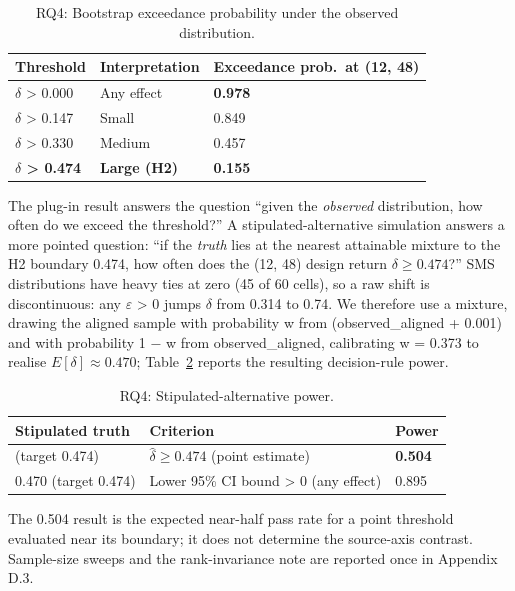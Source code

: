 \documentclass[review,12pt,authoryear]{elsarticle}
\begin{document}
{\def\LTcaptype{table} %
\begin{longtable}[]{@{}lll@{}}
\caption{RQ4: Bootstrap exceedance probability under the observed
distribution.}\label{tab:rq4-observed-exceedance}\\
\toprule\noalign{}
Threshold & Interpretation & Exceedance prob.\ at (12, 48) \\
\midrule\noalign{}
\endhead
\bottomrule\noalign{}
\endlastfoot
$\delta$ \textgreater{} 0.000 & Any effect & \textbf{0.978} \\
$\delta$ \textgreater{} 0.147 & Small & 0.849 \\
$\delta$ \textgreater{} 0.330 & Medium & 0.457 \\
\textbf{$\delta$ \textgreater{} 0.474} & \textbf{Large (H2)} &
\textbf{0.155} \\
\end{longtable}
}

The plug-in result answers the question ``given the \emph{observed}
distribution, how often do we exceed the threshold?'' A
stipulated-alternative simulation answers a more pointed question: ``if
the \emph{truth} lies at the nearest attainable mixture to the H2
boundary 0.474, how often does the (12,
48) design return $\delta \geq 0.474$?'' SMS distributions have heavy ties at zero
(45 of 60 cells), so a raw shift is discontinuous: any $\varepsilon$ \textgreater{}
0 jumps $\delta$ from 0.314 to 0.74. We therefore use a mixture, drawing the
aligned sample with probability w from (observed\_aligned + 0.001) and
with probability 1 − w from observed\_aligned, calibrating w = 0.373 to
realise $E[\delta] \approx 0.470$; Table~\ref{tab:p2-11} reports the
resulting decision-rule power.

{\def\LTcaptype{table} %
\begin{longtable}[]{@{}lll@{}}
\caption{RQ4: Stipulated-alternative power.}\label{tab:p2-11}\\
\toprule\noalign{}
Stipulated truth & Criterion & Power \\
\midrule\noalign{}
\endfirsthead
\endhead
\bottomrule\noalign{}
\endlastfoot
0.470 (target 0.474) & $\hat{\delta} \geq 0.474$ (point estimate) & \textbf{0.504} \\
0.470 (target 0.474) & Lower 95\% CI bound \textgreater{} 0 (any effect) & 0.895 \\
\end{longtable}
}

The 0.504 result is the expected near-half pass rate for a point
threshold evaluated near its boundary; it does not determine the
source-axis contrast. Sample-size sweeps and the rank-invariance note
are reported once in Appendix D.3.
\end{document}
